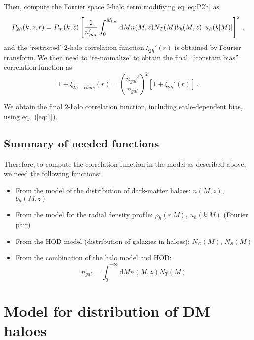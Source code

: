\documentclass[10pt,a4paper]{article}
\begin{document}
Then, compute the Fourier space 2-halo term modifiying eq.\ref{eq:P2h} as
\begin{equation}
  \label{eq:3}
  P_{2h}(k,z, r) = P_m(k,z)\left[ \frac{1}{n_{gal}'} \int_0^{M_{\rm lim}} \mathrm{d}M n(M,z) N_T(M) b_h(M,z) \left| u_h(k|M)\right| \right]^2 \, ,
\end{equation}
and the `restricted' 2-halo correlation function $\xi_{2h}'(r)$ is obtained by Fourier transform. We then need to `re-normalize' to obtain the final, ``constant bias'' correlation function as
\begin{equation}
  \label{eq:4}
  1 + \xi_{2h-cbias}(r) = \left( \frac{n_{gal}'}{n_{gal}} \right)^2 \left[1 + \xi_{2h}'(r)\right] \, .
\end{equation}

We obtain the final 2-halo correlation function, including scale-dependent bias, using eq.~(\ref{eq:1}).



\subsection{Summary of needed functions}

Therefore, to compute the correlation function in the model as described above, we need the following functions:

\begin{itemize}
\item From the model of the distribution of dark-matter haloes: $n(M,z)$, $b_h(M,z)$
\item From the model for the radial density profile: $\rho_h(r|M)$, $u_h(k|M)$ (Fourier pair)
\item From the HOD model (distribution of galaxies in haloes): $N_C(M)$, $N_S(M)$
\item From the combination of the halo model and HOD:
\begin{equation}
n_{gal} = \int_0^{+\infty} \mathrm{d}M n(M,z) N_T(M)
\end{equation}
\end{itemize}



\section{Model for distribution of DM haloes}
\end{document}
